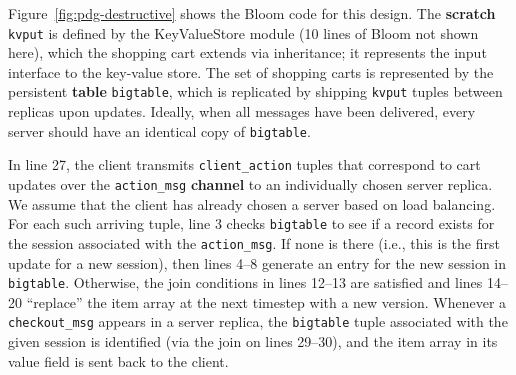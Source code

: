 Figure~\ref{fig:pdg-destructive} shows the Bloom code for this design.  The
\textbf{scratch} \texttt{kvput} is defined by the KeyValueStore module (10
lines of Bloom not shown here), which the shopping cart extends via
inheritance; it represents the input interface to the key-value store.
The set of shopping carts is represented by the persistent \textbf{table} \texttt{bigtable}, which is replicated
by shipping \texttt{kvput} tuples between replicas upon updates. 
Ideally, when all messages have been delivered, every server should have an 
identical copy of \texttt{bigtable}.

In line 27, the client transmits \texttt{client\_action} tuples that correspond to cart
updates over the \texttt{action\_msg} \textbf{channel} to an individually
chosen server replica.  We assume that the client has already chosen a server
based on load balancing.
For each such arriving
tuple, line 3
checks \texttt{bigtable} to see if a record exists for the
session associated with the \texttt{action\_msg}.  If none is there (i.e., this
is the first update for a new session), then lines 4--8 generate an entry for
the new session in \texttt{bigtable}.  Otherwise, the join conditions in lines 12--13 are
satisfied and lines 14--20 ``replace'' the item array
at the next timestep with a new version.  
Whenever a \texttt{checkout\_msg} appears in a server replica, the 
\texttt{bigtable} tuple associated with the given session is identified (via the join
on lines 29--30), and the item array in its value field is sent back to the client.  


